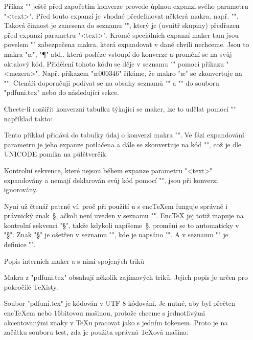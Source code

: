 Příkaz "\pdfunidef" ještě před započetím konverze provede úplnou expanzi
svého parametru "<text>". Před touto expanzí je vhodné předefinovat některá
makra, např. "\def\TeX{TeX}". Taková činnost je zanesena do seznamu
"\pdfunipre", který je (uvnitř skupiny) předřazen před expanzí parametru
"<text>". Kromě speciálních expanzí maker tam jsou povelem
"\let\makro\relax" zabezpečena makra, která expandovat v dané chvíli
nechceme. Jsou to makra "\ae", "\P" atd., která posléze 
vstoupí do konverze a promění se na svůj oktalový kód.
Přidělení tohoto kódu se děje v seznamu "\pdfunipost" pomocí příkazu 
"\odef\makro<6ciferný kód><mezera>". Např. příkazem 
"\odef\ae000346" říkáme, že makro "\ae" se zkonvertuje na "".
Čtenáři doporučuji podívat se na obsahy seznamů "\pdfunipre" a "\pdfunipost"
do souboru "pdfuni.tex" nebo do následující sekce.

Chcete-li rozšířit konverzní tabulku týkající se maker, lze to udělat
pomocí "\addto" například takto:

\begtt
\addto\pdfunipre{\let\endash\relax} \addto{}
\endtt

Tento příklad přidává do tabulky údaj o konverzi makra "\endash". Ve fázi
expandování parametru je jeho expanze potlačena a dále se zkonvertuje na
kód "", což je dle UNICODE pomlka na půlčtverčík.

Kontrolní sekvence, které nejsou během expanze parametru "<text>"
expandovány a nemají deklarován svůj kód pomocí "\odef", jsou při konverzi 
ignorovány.

Nyní už čtenář patrně ví, proč při použití \csplain{}u s enc\TeX{}em funguje
správně i právnický znak~§, ačkoli není uveden v seznamu "\pdfunichars".
Enc\TeX{} jej totiž mapuje na kontrolní sekvenci "\S", takže kdykoli
napíšeme~§, promění se to automaticky v "\S". 
Znak "\S" je ošetřen v seznamu "\pdfunipre", kde je napsáno
"\let\S\relax". A v seznamu "\pdfunipost" je definice "\odef\S000247".


\sec Popis interních maker a s nimi spojených triků

Makra z "pdfuni.tex" obsahují několik zajímavých triků. Jejich popis je
určen pro pokročilé \TeX{}isty.

Soubor "pdfuni.tex" je kódován v UTF-8 kódování. Je nutné, aby byl přečten
enc\TeX{}em nebo 16bitovou mašinou, protože chceme s jednotlivými
akcentovanými znaky v \TeX{}u pracovat jako s jedním tokenem. Proto je na
začátku souboru test, zda je použita správná \TeX{}ová mašina:

